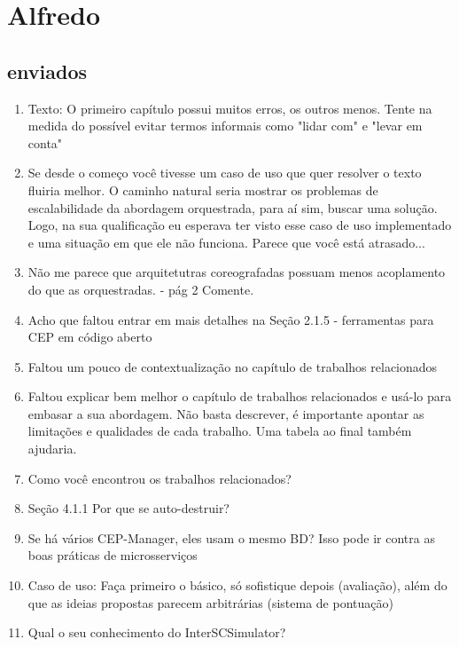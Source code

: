 \section{Alfredo}

\subsection{enviados}
\begin{enumerate}

\item Texto: O primeiro capítulo possui muitos erros, os outros menos. Tente na medida do possível evitar termos informais como "lidar com" e "levar em conta"


\item Se desde o começo você tivesse um caso de uso que quer resolver o texto fluiria melhor. O caminho natural seria mostrar os problemas de escalabilidade da abordagem orquestrada, para aí sim, buscar uma solução. Logo, na sua qualificação eu esperava ter visto esse caso de uso implementado e uma situação em que ele não funciona. Parece que você está atrasado...


\item Não me parece que arquitetutras coreografadas possuam menos acoplamento do que as orquestradas. - pág 2 Comente.

\item Acho que faltou entrar em mais detalhes na Seção 2.1.5 - ferramentas para CEP em código aberto

\item Faltou um pouco de contextualização no capítulo de trabalhos relacionados
\item Faltou explicar bem melhor o capítulo de trabalhos relacionados e usá-lo para embasar a sua abordagem. Não basta descrever, é importante apontar as limitações e qualidades
de cada trabalho. Uma tabela ao final também ajudaria.

\item Como você encontrou os trabalhos relacionados?

\item Seção 4.1.1 Por que se auto-destruir?

\item Se há vários CEP-Manager, eles usam o mesmo BD? Isso pode ir contra as boas práticas de microsserviços

\item Caso de uso: Faça primeiro o básico, só sofistique depois (avaliação), além do que as ideias propostas parecem arbitrárias (sistema de pontuação)


\item Qual o seu conhecimento do InterSCSimulator?
\end{enumerate}

